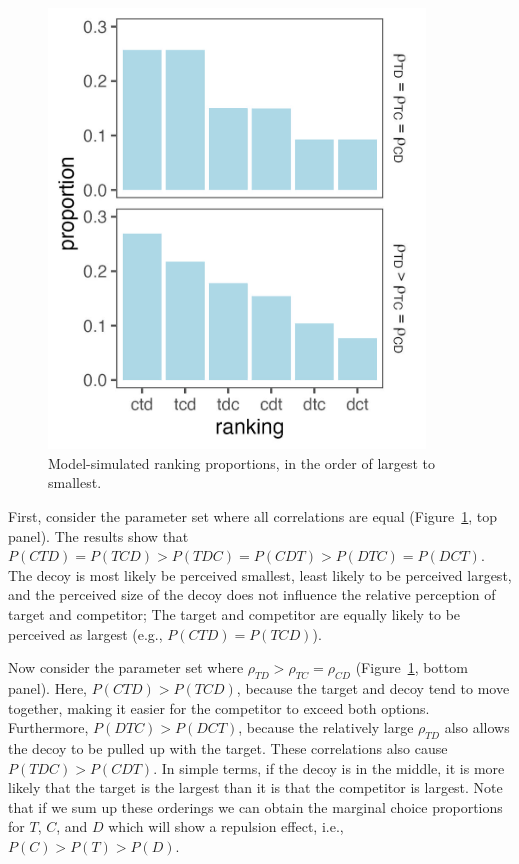 \begin{figure}
   \includegraphics[width=100mm]{figures/sim_mvnorm_rank.jpeg}
   \caption{Model-simulated ranking proportions, in the order of largest to smallest.}
   \label{fig:sim_orderings}
\end{figure}

First, consider the parameter set where all correlations are equal (Figure~\ref{fig:sim_orderings}, top panel). The results show that $P(CTD)=P(TCD)>P(TDC)=P(CDT)>P(DTC)=P(DCT)$. The decoy is most likely be perceived smallest, least likely to be perceived largest, and the perceived size of the decoy does not influence the relative perception of target and competitor; The target and competitor are equally likely to be perceived as largest (e.g., $P(CTD)=P(TCD)$).

Now consider the parameter set where $\rho_{TD}>\rho_{TC}=\rho_{CD}$ (Figure~\ref{fig:sim_orderings}, bottom panel). Here, $P(CTD)>P(TCD)$, because the target and decoy tend to move together, making it easier for the competitor to exceed both options. Furthermore, $P(DTC)>P(DCT)$, because the relatively large $\rho_{TD}$ also allows the decoy to be pulled up with the target. These correlations also cause $P(TDC)>P(CDT)$. In simple terms, if the decoy is in the middle, it is more likely that the target is the largest than it is that the competitor is largest. Note that if we sum up these orderings we can obtain the marginal choice proportions for $T$, $C$, and $D$ which will show a repulsion effect, i.e., $P(C)>P(T)>P(D)$. 

